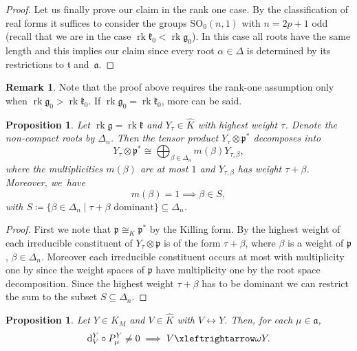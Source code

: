 \documentclass[JEP,XML,SOM,NoFloatCountersInSection,Unicode,published]{cedram}
\newtheorem{proposition}[theorem]{Proposition}
\theoremstyle{definition}
\newtheorem{remark}[theorem]{Remark}
\newcommand{\lra}{\ensuremath{\leftrightarrow}}
\newcommand{\lraomega}{\ensuremath{\xleftrightarrow\omega}}
\newcommand{\mf}[1]{\ensuremath{\mathfrak{#1}}}
\newcommand{\on}[1]{\ensuremath{\operatorname{#1}}}
\newcommand{\GSO}[1]{\ensuremath{\mathrm{SO}_0(#1,1)}}
\begin{document}
\begin{proof}
Let us finally prove our claim in the rank one case. By the classification of real forms it suffices to consider the groups $\GSO{n}$ with $n=2p+1$ odd (recall that we are in the case $\on{rk}\mf k_0<\on{rk}\mf g_0$). In this case all roots have the same length and this implies our claim since every root $\alpha\in\Delta$ is determined by its restrictions to $\mf t$ and~$\mf a$.
\end{proof}

\begin{remark}
Note that the proof above requires the rank-one assumption only when $\on{rk}\mf g_0>\on{rk}\mf{k}_0$. If $\on{rk}\mf g_0=\on{rk}\mf{k}_0$, more can be said.
\end{remark}

\begin{proposition}\label{prop:tensor_decomp_eq_rk}
Let $\on{rk}\mf g=\on{rk}\mf k$ and $Y_\tau\in\hat K$ with highest weight $\tau$. Denote the non-compact roots by $\Delta_n$. Then the tensor product $Y_\tau\otimes\mf p^*$ decomposes into\vspace*{-3pt}
\[
Y_\tau\otimes\mf p^*\cong\bigoplus_{\beta\in\Delta_n}m(\beta) Y_{\tau,\beta},
\]
where the multiplicities $m(\beta)$ are at most $1$ and $Y_{\tau,\beta}$ has weight $\tau+\beta$. Moreover, we~have\vspace*{-3pt}
\[
m(\beta)=1\implies \beta\in S,
\]
with $S\coloneqq\{\beta\in\Delta_n\mid\tau+\beta\text{ dominant}\}\subseteq\Delta_n$.
\end{proposition}

\begin{proof}
First we note that $\mf p\cong_K\mf p^*$ by the Killing form. By \cite[Prop.\,9.72]{knapplie} the highest weight of each irreducible constituent of $Y_\tau\otimes\mf p$ is of the form $\tau+\beta$, where $\beta$ is a weight of $\mf p$, \ie $\beta\in\Delta_n$. Moreover each irreducible constituent occurs at most with multiplicity one by \cite[Ch.\,IX.8, Probl.\,15]{knapplie} since the weight spaces of $\mf p$ have multiplicity one by the root space decomposition. Since the highest weight $\tau+\beta$ has to be dominant we can restrict the sum to the subset $S\subseteq\Delta_n$.
\end{proof}

\begin{proposition}\label{prop:gen_grad_omega}
Let $Y\in\hat K_M$ and $V\in\hat K$ with $V\lra Y$. Then, for each $\mu\in\mf a$,\vspace*{-3pt}
\[
\mathrm{d}_V^Y\circ P_\mu^Y\neq0\implies V\lraomega Y.
\]
\end{proposition}
\end{document}
